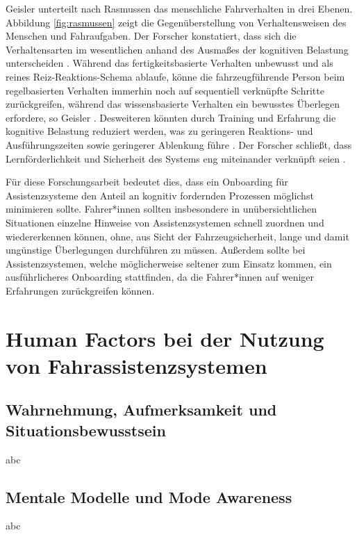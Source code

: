 Geisler \cite{Geisler_hci2021} unterteilt nach Rasmussen \cite{Rasmussen1983} das menschliche Fahrverhalten in drei Ebenen. Abbildung \ref{fig:rasmussen} zeigt die Gegenüberstellung von Verhaltensweisen des Menschen und Fahraufgaben. Der Forscher konstatiert, dass sich die Verhaltensarten im wesentlichen anhand des Ausmaßes der kognitiven Belastung unterscheiden \cite{Geisler_hci2021}. Während das fertigkeitsbasierte Verhalten unbewusst und als reines Reiz-Reaktions-Schema ablaufe, könne die fahrzeugführende Person beim regelbasierten Verhalten immerhin noch auf sequentiell verknüpfte Schritte zurückgreifen, während das wissensbasierte Verhalten ein bewusstes Überlegen erfordere, so Geisler \cite{Geisler_hci2021}. Desweiteren könnten durch Training und Erfahrung die kognitive Belastung reduziert werden, was zu geringeren Reaktions- und Ausführungszeiten sowie geringerer Ablenkung führe \cite{Geisler_hci2021}. Der Forscher schließt, dass Lernförderlichkeit und Sicherheit des Systems eng miteinander verknüpft seien \cite{Geisler_hci2021}.

Für diese Forschungsarbeit bedeutet dies, dass ein Onboarding für Assistenzsysteme den Anteil an kognitiv fordernden Prozessen möglichst minimieren sollte. Fahrer*innen sollten insbesondere in unübersichtlichen Situationen einzelne Hinweise von Assistenzsystemen schnell zuordnen und wiedererkennen können, ohne, aus Sicht der Fahrzeugsicherheit, lange und damit ungünstige Überlegungen durchführen zu müssen. Außerdem sollte bei Assistenzsystemen, welche möglicherweise seltener zum Einsatz kommen, ein ausführlicheres Onboarding stattfinden, da die Fahrer*innen auf weniger Erfahrungen zurückgreifen können.  

\section{Human Factors bei der Nutzung von Fahrassistenzsystemen}
\label{sec:human_factors}

\subsection{Wahrnehmung, Aufmerksamkeit und Situationsbewusstsein}
\label{subsec:wahrnehmung_situationsbewusstsein}
abc

\subsection{Mentale Modelle und Mode Awareness}
\label{subsec:mentale_modelle}
abc

